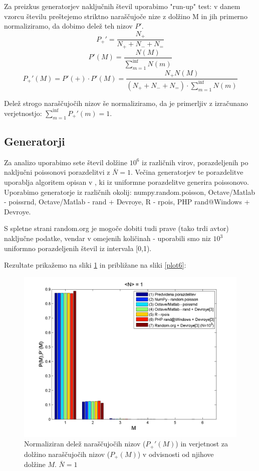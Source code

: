 \documentclass{article}[12pt]
\begin{document}
Za preizkus generatorjev naključnih števil uporabimo "run-up" test: v danem vzorcu številu preštejemo striktno naraščujoče nize z dolžino M in jih primerno normaliziramo, da dobimo delež teh nizov $P'$.
\[
P_+' = \frac{N_+}{N_+ + N_- + N_=}
\]
\[
P'(M) = \frac{N(M)}{ \sum_{m=1}^{\inf} N(m)}
\]
\[
P_+'(M) = P'(+) \cdot P'(M) = \frac{N_+ N(M)}{(N_+ + N_- + N_=) \cdot \sum_{m=1}^{\inf}N(m)}
\]

Delež strogo naraščujočih nizov še normaliziramo, da je primerljiv z izračunano verjetnostjo: $\sum_{m=1}^{\inf} P_+'(m) = 1$.

\subsection{Generatorji}

Za analizo uporabimo sete števil dolžine $10^6$ iz različnih virov, porazdeljenih po naključni poissonovi porazdelitvi z $\bar{N}=1$. Večina generatorjev te porazdelitve uporablja algoritem opisan v \cite[str.~504]{devroye}, ki iz uniformne porazdelitve generira poissonovo.\\
Uporabimo generatorje iz različnih okolij: numpy.random.poisson, Octave/Matlab - poissrnd, Octave/Matlab - rand + Devroye, R - rpois, PHP rand@Windows + Devroye.

S spletne strani random.org je mogoče dobiti tudi prave (tako trdi avtor) naključne podatke, vendar v omejenih količinah - uporabili smo niz $10^3$ uniformno porazdeljenih števil iz intervala [0,1).

Rezultate prikažemo na sliki \ref{plot5} in približane na sliki \ref{plot6}:

\begin{figure}[H]
\begin{center}
\includegraphics[width=14cm]{slike/plot5}
\caption{Normaliziran delež naraščujočih nizov ($P_+'(M)$) in verjetnost za dolžino naraščujočih nizov ($P_+(M)$) v odvisnosti od njihove dolžine $M$. $\bar{N}=1$}
\label{plot5}
\end{center}
\end{figure}
\end{document}
